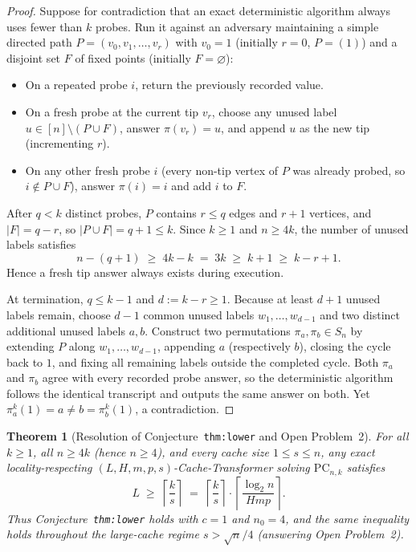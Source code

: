 \documentclass[11pt]{article}
\theoremstyle{plain}
\newtheorem{theorem}{Theorem}
\theoremstyle{definition}
\theoremstyle{remark}
\newcommand{\PC}{\mathrm{PC}}
\begin{document}
\begin{proof}
Suppose for contradiction that an exact deterministic algorithm always uses fewer than $k$ probes. Run it against an adversary maintaining a simple directed path $P = (v_0, v_1, \dots, v_r)$ with $v_0 = 1$ (initially $r = 0$, $P = (1)$) and a disjoint set $F$ of fixed points (initially $F = \varnothing$):
\begin{itemize}[leftmargin=2em,itemsep=1pt,topsep=2pt]
\item On a repeated probe $i$, return the previously recorded value.
\item On a fresh probe at the current tip $v_r$, choose any unused label $u \in [n] \setminus (P \cup F)$, answer $\pi(v_r) = u$, and append $u$ as the new tip (incrementing $r$).
\item On any other fresh probe $i$ (every non-tip vertex of $P$ was already probed, so $i \notin P \cup F$), answer $\pi(i) = i$ and add $i$ to $F$.
\end{itemize}
After $q < k$ distinct probes, $P$ contains $r \le q$ edges and $r + 1$ vertices, and $|F| = q - r$, so $|P \cup F| = q + 1 \le k$.
Since $k \ge 1$ and $n \ge 4k$, the number of unused labels satisfies
\[
n - (q + 1) \;\ge\; 4k - k \;=\; 3k \;\ge\; k + 1 \;\ge\; k - r + 1.
\]
Hence a fresh tip answer always exists during execution.

At termination, $q \le k - 1$ and $d := k - r \ge 1$. Because at least $d + 1$ unused labels remain, choose $d - 1$ common unused labels $w_1, \dots, w_{d-1}$ and two distinct additional unused labels $a, b$.
Construct two permutations $\pi_a, \pi_b \in S_n$ by extending $P$ along $w_1, \dots, w_{d-1}$, appending $a$ (respectively $b$), closing the cycle back to $1$, and fixing all remaining labels outside the completed cycle.
Both $\pi_a$ and $\pi_b$ agree with every recorded probe answer, so the deterministic algorithm follows the identical transcript and outputs the same answer on both.
Yet $\pi_a^k(1) = a \neq b = \pi_b^k(1)$, a contradiction.
\end{proof}

\begin{theorem}[Resolution of Conjecture~\texttt{thm:lower} and Open Problem~2]\label{thm:main}
For all $k \ge 1$, all $n \ge 4k$ (hence $n \ge 4$), and every cache size $1 \le s \le n$, any exact locality-respecting $(L, H, m, p, s)$-Cache-Transformer solving $\PC_{n,k}$ satisfies
\[
L \;\ge\; \left\lceil \frac{k}{s} \right\rceil
\;=\; \left\lceil \frac{k}{s} \right\rceil \cdot \left\lceil \frac{\log_2 n}{Hmp} \right\rceil.
\]
Thus Conjecture~\texttt{thm:lower} holds with $c = 1$ and $n_0 = 4$, and the same inequality holds throughout the large-cache regime $s > \sqrt{n}/4$ (answering Open Problem~2).
\end{theorem}
\end{document}
